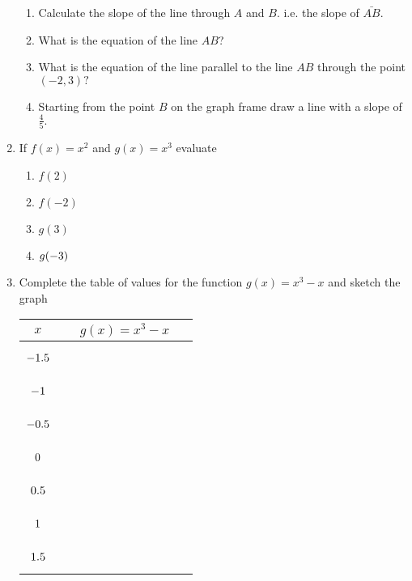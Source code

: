 \begin{enumerate}
\begin{enumerate}
		\item Calculate the slope of the line through $A$ and $B$. i.e. the slope of $\bar{AB}\text{.}$ 
		
		\item What is the equation of the line $A B$? 
		
		\item What is the equation of the line parallel to the line $A B$ through the point $\left ( -2 ,3\right )\text{?}$ 
		
		\item Starting from the point $B$ on the graph frame draw a line with a slope of $\frac{4}{5}\text{.}$ 
	\end{enumerate}

  	
	\item 
	If $f (x) =x^{2}$ and $g (x) =x^{3}$ evaluate 
	
	
	\begin{enumerate}
		\item $f (2)$ 
		
		\item $f ( -2)$ 
		
		\item $g (3)$ 
		
		\item $g ( -3)\vspace{+5.000000cm}$ \end{enumerate}
	
	
	\item 
	Complete the table of values for the function $g (x) =x^{3} -x$ and sketch the graph\vspace{0.5cm} \\\relax
	\begin{tabular}[c]{cc}\hline
		$x$  & $g (x) =x^{3} -x$  \\
		\hline
		$ -1.5\rule[-8pt]{0pt}{24pt}$  & \ \ \ \ \ \ \ \ \ \ \ \ \ \ \ \ \ \ \  \\
		\hline
		$ -1\rule[-8pt]{0pt}{24pt}$  &  \\
		\hline
		$ -0.5\rule[-8pt]{0pt}{24pt}$  &  \\
		\hline
		$0\rule[-8pt]{0pt}{24pt}$  &  \\
		\hline
		$0.5\rule[-8pt]{0pt}{24pt}$  &  \\
		\hline
		$1\rule[-8pt]{0pt}{24pt}$  &  \\
		\hline
		$1.5\rule[-8pt]{0pt}{24pt}$  &  \\
		\hline
	\end{tabular} \\\relax
	\setlength\fboxrule{0in}\setlength\fboxsep{0.2in}
	 

\end{enumerate}
